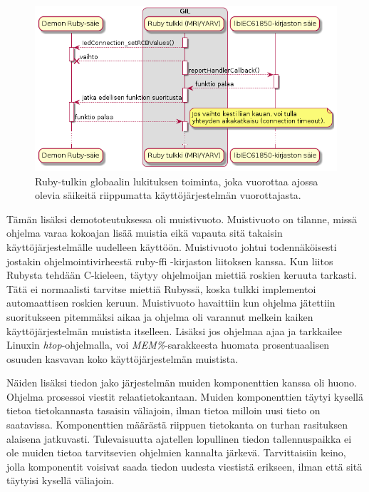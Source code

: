 \begin{figure}[ht!]
	\includegraphics[width=1\textwidth]{pictures/ruby-gil.png}
	\caption{Ruby-tulkin globaalin lukituksen toiminta, joka vuorottaa ajossa olevia säikeitä riippumatta käyttöjärjestelmän vuorottajasta.}
	\label{fig:ruby-gil}
\end{figure}

Tämän lisäksi demototeutuksessa oli muistivuoto. Muistivuoto on tilanne, missä ohjelma varaa kokoajan lisää muistia eikä vapauta sitä takaisin käyttöjärjestelmälle uudelleen käyttöön. Muistivuoto johtui todennäköisesti jostakin ohjelmointivirheestä ruby-ffi -kirjaston liitoksen kanssa. Kun liitos Rubysta tehdään C-kieleen, täytyy ohjelmoijan miettiä roskien keruuta tarkasti. Tätä ei normaalisti tarvitse miettiä Rubyssä, koska tulkki implementoi automaattisen roskien keruun. Muistivuoto havaittiin kun ohjelma jätettiin suoritukseen pitemmäksi aikaa ja ohjelma oli varannut melkein kaiken käyttöjärjestelmän muistista itselleen. Lisäksi jos ohjelmaa ajaa ja tarkkailee Linuxin \emph{htop}-ohjelmalla, voi \emph{MEM\%}-sarakkeesta huomata prosentuaalisen osuuden kasvavan koko käyttöjärjestelmän muistista.

Näiden lisäksi tiedon jako järjestelmän muiden komponenttien kanssa oli huono. Ohjelma prosessoi viestit relaatietokantaan. Muiden komponenttien täytyi kysellä tietoa tietokannasta tasaisin väliajoin, ilman tietoa milloin uusi tieto on saatavissa. Komponenttien määrästä riippuen tietokanta on turhan rasituksen alaisena jatkuvasti. Tulevaisuutta ajatellen lopullinen tiedon tallennuspaikka ei ole muiden tietoa tarvitsevien ohjelmien kannalta järkevä. Tarvittaisiin keino, jolla komponentit voisivat saada tiedon uudesta viestistä erikseen, ilman että sitä täytyisi kysellä väliajoin.